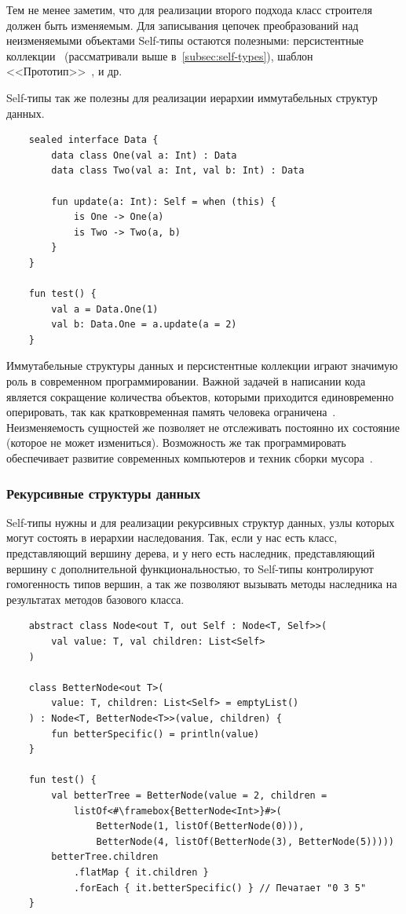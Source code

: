 Тем не менее заметим, что для реализации второго подхода класс строителя должен быть изменяемым.
Для записывания цепочек преобразований над неизменяемыми объектами Self-типы остаются полезными: персистентные коллекции~\cite{okasaki1999purely} (рассматривали выше в~\ref{subsec:self-types}), шаблон <<Прототип>>~\cite{hannemann2002design}, и др.

Self-типы так же полезны для реализации иерархии иммутабельных структур данных.

\begin{verbatim}
    sealed interface Data {
        data class One(val a: Int) : Data
        data class Two(val a: Int, val b: Int) : Data

        fun update(a: Int): Self = when (this) {
            is One -> One(a)
            is Two -> Two(a, b)
        }
    }

    fun test() {
        val a = Data.One(1)
        val b: Data.One = a.update(a = 2)
    }
\end{verbatim}

Иммутабельные структуры данных и персистентные коллекции играют значимую роль в современном программировании.
Важной задачей в написании кода является сокращение количества объектов, которыми приходится единовременно оперировать, так как кратковременная память человека ограничена~\cite{lisman1995storage}.
Неизменяемость сущностей же позволяет не отслеживать постоянно их состояние (которое не может измениться).
Возможность же так программировать обеспечивает развитие современных компьютеров и техник сборки мусора~\cite{jones2016garbage}.

\subsubsection{Рекурсивные структуры данных}

Self-типы нужны и для реализации рекурсивных структур данных, узлы которых могут состоять в иерархии наследования.
Так, если у нас есть класс, представляющий вершину дерева, и у него есть наследник, представляющий вершину с дополнительной функциональностью, то Self-типы контролируют гомогенность типов вершин, а так же позволяют вызывать методы наследника на результатах методов базового класса.

\begin{verbatim}
    abstract class Node<out T, out Self : Node<T, Self>>(
        val value: T, val children: List<Self>
    )

    class BetterNode<out T>(
        value: T, children: List<Self> = emptyList()
    ) : Node<T, BetterNode<T>>(value, children) {
        fun betterSpecific() = println(value)
    }

    fun test() {
        val betterTree = BetterNode(value = 2, children =
            listOf<#\framebox{BetterNode<Int>}#>(
                BetterNode(1, listOf(BetterNode(0))),
                BetterNode(4, listOf(BetterNode(3), BetterNode(5)))))
        betterTree.children
            .flatMap { it.children }
            .forEach { it.betterSpecific() } // Печатает "0 3 5"
    }
\end{verbatim}

